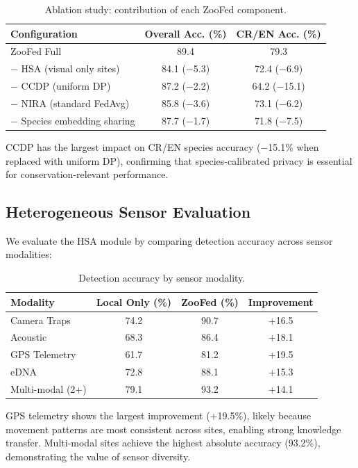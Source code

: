 \begin{table}[H]
\centering
\caption{Ablation study: contribution of each ZooFed component.}
\label{tab:ablation}
\begin{tabular}{@{}lcc@{}}
\toprule
\textbf{Configuration} & \textbf{Overall Acc. (\%)} & \textbf{CR/EN Acc. (\%)} \\
\midrule
ZooFed Full & 89.4 & 79.3 \\
$-$ HSA (visual only sites) & 84.1 ($-$5.3) & 72.4 ($-$6.9) \\
$-$ CCDP (uniform DP) & 87.2 ($-$2.2) & 64.2 ($-$15.1) \\
$-$ NIRA (standard FedAvg) & 85.8 ($-$3.6) & 73.1 ($-$6.2) \\
$-$ Species embedding sharing & 87.7 ($-$1.7) & 71.8 ($-$7.5) \\
\bottomrule
\end{tabular}
\end{table}

CCDP has the largest impact on CR/EN species accuracy ($-$15.1\% when replaced with uniform DP), confirming that species-calibrated privacy is essential for conservation-relevant performance.

\subsection{Heterogeneous Sensor Evaluation}

We evaluate the HSA module by comparing detection accuracy across sensor modalities:

\begin{table}[H]
\centering
\caption{Detection accuracy by sensor modality.}
\label{tab:sensor_accuracy}
\begin{tabular}{@{}lccc@{}}
\toprule
\textbf{Modality} & \textbf{Local Only (\%)} & \textbf{ZooFed (\%)} & \textbf{Improvement} \\
\midrule
Camera Traps & 74.2 & 90.7 & +16.5 \\
Acoustic & 68.3 & 86.4 & +18.1 \\
GPS Telemetry & 61.7 & 81.2 & +19.5 \\
eDNA & 72.8 & 88.1 & +15.3 \\
Multi-modal (2+) & 79.1 & 93.2 & +14.1 \\
\bottomrule
\end{tabular}
\end{table}

GPS telemetry shows the largest improvement (+19.5\%), likely because movement patterns are most consistent across sites, enabling strong knowledge transfer.
Multi-modal sites achieve the highest absolute accuracy (93.2\%), demonstrating the value of sensor diversity.

